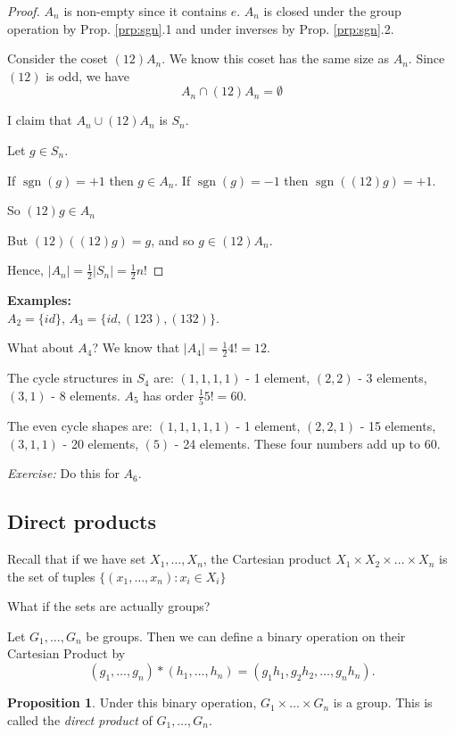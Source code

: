 \documentclass{article}
\theoremstyle{definition} \newtheorem*{definition}{Definition}
\newtheorem{proposition}[theorem]{Proposition}
\DeclareMathOperator{\sgn}{sgn} \DeclareMathOperator{\id}{id}
\begin{document}
\begin{proof} $A_n$ is non-empty since it contains $e$. $A_n$ is closed under
  the group operation by Prop. \ref{prp:sgn}.1 and under inverses by Prop.
  \ref{prp:sgn}.2.

  Consider the coset $(12) A_n$. We know this coset has the same size as $A_n.$
  Since $(1 2)$ is odd, we have \begin{equation*} A_n \cap (1 2) A_n  =
    \emptyset \end{equation*}

I claim that $A_n \cup (1 2) A_n $ is $S_n$. 

Let $g \in S_n$.

If $\sgn(g) = +1$ then $g \in A_n$.  If $\sgn(g) = -1$ then $\sgn\left( (12) g
\right)= +1$.

So $(12)g \in A_n$

But $(1 2)\left( (1 2) g \right)=g$, and so $g \in (1 2)A_n$.

Hence, $|A_n|=\frac{1}{2}|S_n|=\frac{1}{2}n!$

\end{proof}

\textbf{Examples:}\\ $A_2 = \{ id \}$, $A_3 = \{id, (123), (132)\}$.

What about $A_4$? We know that $|A_4|=\frac{1}{2}4!=12$.

The cycle structures in $S_4$ are: $(1,1,1,1)$ - 1 element, $(2,2)$ - 3
elements, $(3,1)$ - 8 elements.  $A_5$ has order $\frac{1}{5}5! = 60$.

The even cycle shapes are: $(1,1,1,1,1)$ - 1 element, $(2,2,1)$ - 15 elements,
$(3,1,1)$ - 20 elements, $(5)$ - 24 elements. These four numbers add up to 60.

\emph{Exercise:} Do this for $A_6$.

\subsection{Direct products} Recall that if we have set $X_1, \ldots, X_n$, the
Cartesian product $X_1 \times X_2 \times \ldots \times X_n$ is the set of
tuples $\{(x_1, \ldots,x_n) : x_i \in X_i\}$

What if the sets are actually groups?

Let $G_1 , \ldots, G_n$ be groups. Then we can define a binary operation on
their Cartesian Product by $$(g_1, \ldots, g_n) * (h_1, \ldots , h_n) =
(g_1h_1, g_2h_2, \ldots, g_nh_n).$$ \begin{proposition} Under this binary
  operation, $G_1 \times \ldots \times G_n$ is a group. This is called the
  \textit{direct product} of $G_1 , \ldots, G_n$.  \end{proposition}
\end{document}
